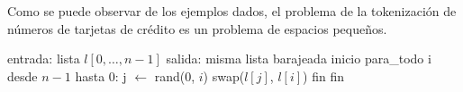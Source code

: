 Como se puede observar de los ejemplos dados, el problema de la tokenización
de números de tarjetas de crédito es un problema de espacios pequeños.

\begin{pseudocodigo}[%
  caption={\textit{Knuth shuffle}, \cite{DBLP:books/aw/Knuth69}.},
  label={knuth_shuffle}%
]
  entrada: lista $ l[0, \dots, n - 1] $
  salida:  misma lista barajeada
  inicio
    para_todo i desde $ n - 1 $ hasta 0:
      j $ \gets $ rand($ 0 $, $ i $)
      swap($ l[j] $, $ l[i] $)
    fin
  fin
\end{pseudocodigo}
